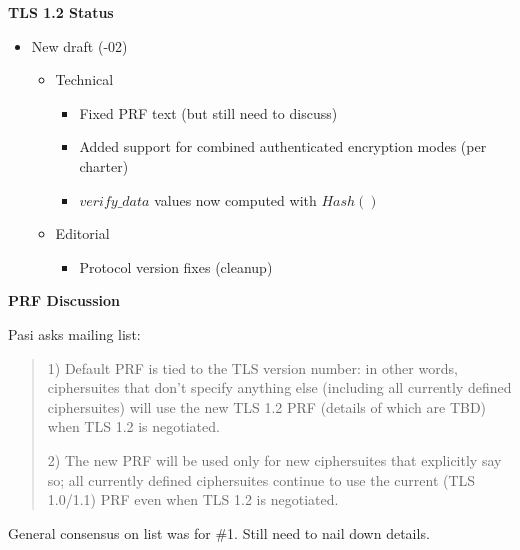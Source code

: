 \documentclass[fancybox]{seminar}
\newcommand{\heading}[1]{%
  \begin{center}
    \large\bf
    #1
  \end{center}
  \vspace{.4 in}}
\begin{document}
\begin{slide}
\heading{TLS 1.2 Status}

\begin{itemize}
\item New draft (-02)
\begin{itemize}
\item Technical
\begin{itemize}
\item Fixed PRF text (but still need to discuss)
\item Added support for combined authenticated encryption modes (per charter)
\item $verify\_data$ values now computed with $Hash()$
\end{itemize}
\item Editorial
\begin{itemize}
\item Protocol version fixes (cleanup)
\end{itemize}
\end{itemize}
\end{itemize}
\end{slide}


\begin{slide}
\heading{PRF Discussion}

Pasi asks mailing list:

\begin{quote}
1) Default PRF is tied to the TLS version number: in other words,
ciphersuites that don't specify anything else (including all
currently defined ciphersuites) will use the new TLS 1.2 PRF
(details of which are TBD) when TLS 1.2 is negotiated.

2) The new PRF will be used only for new ciphersuites that
explicitly say so; all currently defined ciphersuites continue to
use the current (TLS 1.0/1.1) PRF even when TLS 1.2 is negotiated.
\end{quote}

General consensus on list was for \#1. Still need to nail down
details.
\end{slide}
\end{document}
